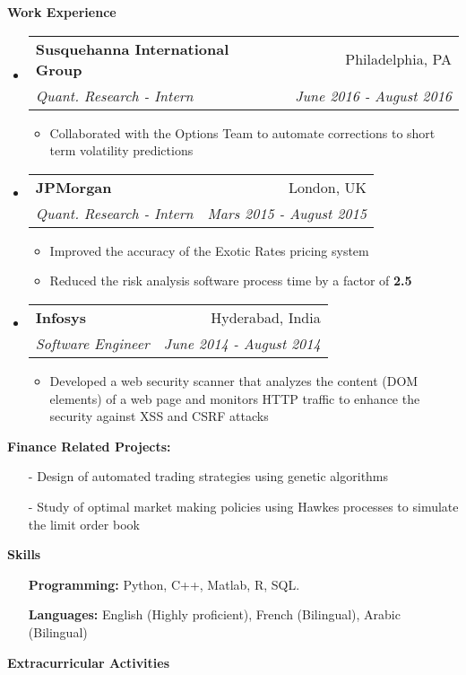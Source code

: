 \documentclass[letterpaper,11pt]{article}
\makeatletter
\newcommand{\resitem}[1]{\item #1 \vspace{-2pt}}
\newcommand{\resheading}[1]{\begin{mdframed}[backgroundcolor=gray!20] \bf{#1}  \end{mdframed}}
\newcommand{\ressubheading}[4]{
  \begin{tabular*}{6.5in}{l@{\extracolsep{\fill}}r}
    \textbf{#1} & #2 \\
    \textit{#3} & \textit{#4} \\
  \end{tabular*}\vspace{-6pt}}
\makeatother
\begin{document}
\resheading{Work Experience}
\begin{itemize}
\item
  \ressubheading{Susquehanna International Group}{Philadelphia, PA}{Quant. Research  - Intern}{June 2016 - August 2016}
  \begin{itemize}
    \resitem{Collaborated with the Options Team to automate corrections to short term volatility predictions}
  \end{itemize}
\item
  \ressubheading{JPMorgan}{London, UK}{Quant. Research - Intern}{Mars 2015 - August 2015}
  \begin{itemize}
    \resitem{Improved the accuracy of the Exotic Rates pricing system}
    \resitem{Reduced the risk analysis software process time by a factor of \textbf{2.5}}
  \end{itemize}
\item
  \ressubheading{Infosys}{Hyderabad, India}{Software Engineer}{June 2014 - August 2014}
  \begin{itemize}
    \resitem{Developed a web security scanner that analyzes the content (DOM elements) of a web page and monitors HTTP traffic to enhance the security against XSS and CSRF attacks}
  \end{itemize}
\end{itemize}

\resheading{Finance Related Projects:}
\begin{itemize}
\item[-] Design of automated trading strategies using genetic algorithms\vspace{-5pt}
\item[-] Study of optimal market making policies using Hawkes processes to simulate the limit order book
\end{itemize}

\resheading{Skills}
\begin{itemize}
\item[] \textbf{Programming:}  Python, C++, Matlab, R, SQL.
  \vspace{-5pt}
\item[] \textbf{Languages:} English (Highly proficient), French (Bilingual),  Arabic (Bilingual)
\end{itemize}

\resheading{Extracurricular Activities}
\end{document}
